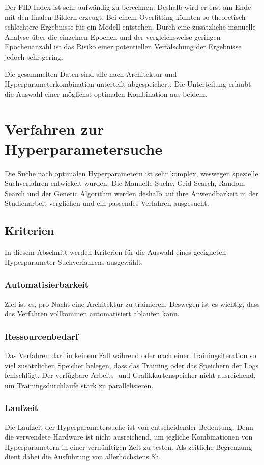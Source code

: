 Der \acrshort{FID}-Index ist sehr aufwändig zu berechnen.
Deshalb wird er erst am Ende mit den finalen Bildern erzeugt.
Bei einem Overfitting könnten so theoretisch schlechtere Ergebnisse für ein Modell entstehen.
Durch eine zusätzliche manuelle Analyse über die einzelnen Epochen und der vergleichsweise geringen Epochenanzahl ist das Risiko einer potentiellen Verfälschung der Ergebnisse jedoch sehr gering.
\newline

Die gesammelten Daten sind alle nach Architektur und Hyperparameterkombination unterteilt abgespeichert.
Die Unterteilung erlaubt die Auswahl einer möglichst optimalen Kombination aus beidem.

\section{Verfahren zur Hyperparametersuche}
Die Suche nach optimalen Hyperparametern ist sehr komplex, weswegen spezielle Suchverfahren entwickelt wurden.
Die Manuelle Suche, Grid Search, Random Search und der Genetic Algorithm werden deshalb auf ihre Anwendbarkeit in der Studienarbeit verglichen und ein passendes Verfahren ausgesucht.


\subsection{Kriterien}
In diesem Abschnitt werden Kriterien für die Auswahl eines geeigneten Hyperparameter Suchverfahrens ausgewählt.

\subsubsection{Automatisierbarkeit}
Ziel ist es, pro Nacht eine Architektur zu trainieren.
Deswegen ist es wichtig, dass das Verfahren vollkommen automatisiert ablaufen kann.

\subsubsection{Ressourcenbedarf}
Das Verfahren darf in keinem Fall während oder nach einer Trainingsiteration so viel zusätzlichen Speicher belegen, dass das Training oder das Speichern der Logs fehlschlägt.
Der verfügbare Arbeits- und Grafikkartenspeicher nicht ausreichend, um Trainingsdurchläufe stark zu parallelisieren.

\subsubsection{Laufzeit}
Die Laufzeit der Hyperparametersuche ist von entscheidender Bedeutung.
Denn die verwendete Hardware ist nicht ausreichend, um jegliche Kombinationen von Hyperparametern in einer vernünftigen Zeit zu testen.
Als zeitliche Begrenzung dient dabei die Ausführung von allerhöchstens 8h.
\newline

